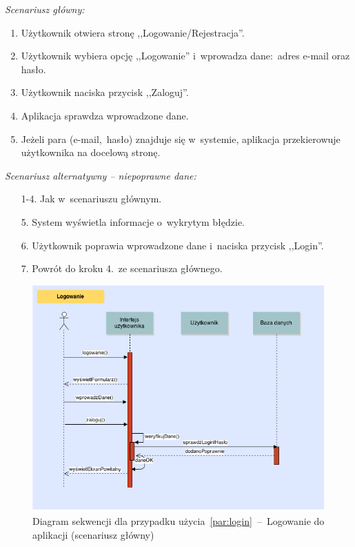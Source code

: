 \noindent \textit{Scenariusz główny:}
\begin{enumerate}
  \item Użytkownik otwiera stronę ,,Logowanie/Rejestracja''.
  \item Użytkownik wybiera opcję ,,Logowanie'' i~wprowadza dane:~adres e-mail oraz hasło.
  \item Użytkownik naciska przycisk ,,Zaloguj''.
  \item Aplikacja sprawdza wprowadzone dane.
  \item Jeżeli para (e-mail,~hasło) znajduje się w~systemie, aplikacja przekierowuje użytkownika na docelową stronę.
\end{enumerate}

\noindent \textit{Scenariusz alternatywny -- niepoprawne dane:}
\begin{enumerate}
  \item[1-4.] Jak w~scenariuszu głównym.
  \item[5.] System wyświetla informacje o~wykrytym błędzie.
  \item[6.] Użytkownik poprawia wprowadzone dane i~naciska przycisk ,,Login''.
  \item[7.] Powrót do kroku 4.~ze scenariusza głównego.
\end{enumerate}

\begin{figure}[H]
  \includegraphics[width=\textwidth]{images/logowanie.png}
  \caption{Diagram sekwencji dla przypadku użycia~\ref{par:login}~--~Logowanie do aplikacji (scenariusz główny)}
\end{figure}

